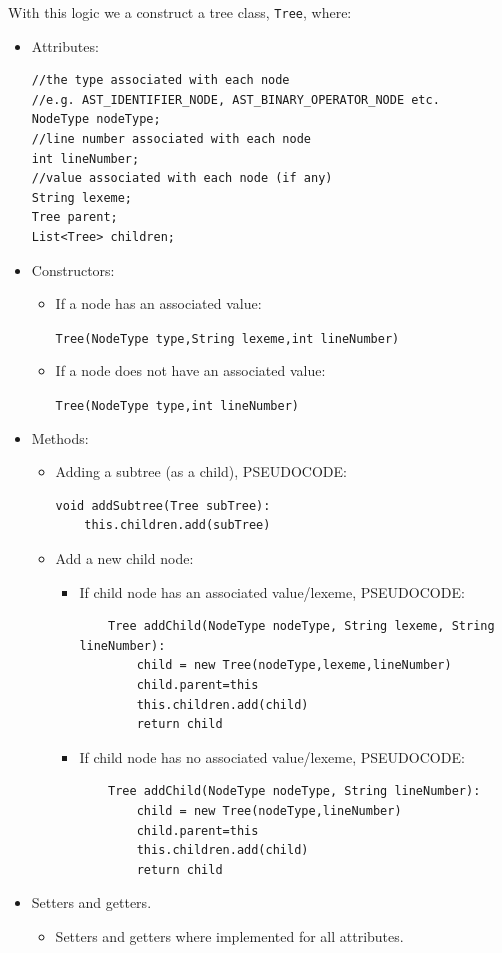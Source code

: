 With this logic we a construct a tree class, \verb!Tree!, where:
\begin{itemize}
	\item Attributes:
	      \begin{lstlisting}
//the type associated with each node
//e.g. AST_IDENTIFIER_NODE, AST_BINARY_OPERATOR_NODE etc.
NodeType nodeType;
//line number associated with each node
int lineNumber;
//value associated with each node (if any)
String lexeme;
Tree parent;
List<Tree> children;
	      \end{lstlisting}
	\item Constructors:
	      \begin{itemize}
	      	\item If a node has an associated value:
	      	              
	      	      \verb!Tree(NodeType type,String lexeme,int lineNumber)!
	      	\item If a node does not have an associated value:
	      	              
	      	      \verb!Tree(NodeType type,int lineNumber)!
	      \end{itemize}
	\item Methods:
	      \begin{itemize}
	      	\item Adding a subtree (as a child), PSEUDOCODE:
	      	      \begin{lstlisting}
void addSubtree(Tree subTree):
    this.children.add(subTree)
	      	      \end{lstlisting}
	      	\item Add a new child node:
	      	      \begin{itemize}
	      	      	\item If child node has an associated value/lexeme, PSEUDOCODE:
	      	      	      \begin{lstlisting}
    Tree addChild(NodeType nodeType, String lexeme, String lineNumber):
        child = new Tree(nodeType,lexeme,lineNumber)
        child.parent=this
        this.children.add(child)
        return child
	      	      	      \end{lstlisting}
	      	      	\item If child node has no associated value/lexeme, PSEUDOCODE:
	      	      	      \begin{lstlisting}
    Tree addChild(NodeType nodeType, String lineNumber):
        child = new Tree(nodeType,lineNumber)
        child.parent=this
        this.children.add(child)
        return child
	      	      	      \end{lstlisting}
	      	      \end{itemize}
	      \end{itemize}
	\item Setters and getters.
	      \begin{itemize}
	      	\item Setters and getters where implemented for all attributes.
	      \end{itemize}
	      
\end{itemize}

